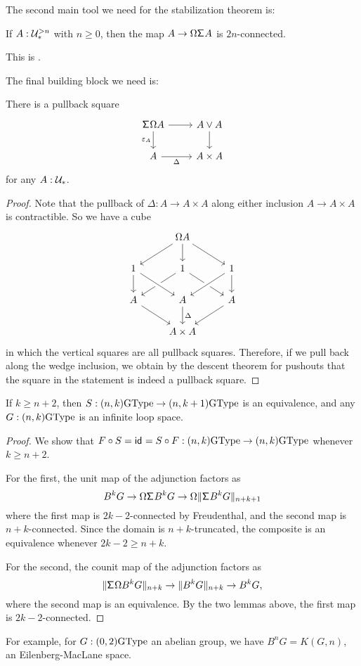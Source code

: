 The second main tool we need for the stabilization theorem is:
\begin{thm}[Freudenthal]
  If $A : \UU_\pt^{>n}$ with $n\ge 0$, then the map
  $A \to \Omega\susp A$ is $2n$-connected.
\end{thm}
This is \cite[Theorem~8.6.4]{TheBook}.

The final building block we need is:
\begin{lem}
  There is a pullback square
  \[
    \begin{tikzcd}
      \susp\Omega A \ar[d,"\varepsilon_A"']\ar[r] & A \vee A \ar[d] \\
      A \ar[r,"\Delta"'] & A \times A
    \end{tikzcd}
  \]
  for any $A : \UU_\pt$.
\end{lem}

\begin{proof}
Note that the pullback of $\Delta:A\to A\times A$ along either inclusion $A\to A\times A$ is contractible. So we have a cube
\begin{equation*}
\begin{tikzcd}
& \Omega A \arrow[dl] \arrow[d] \arrow[dr] \\
1 \arrow[d] & 1 \arrow[dl] \arrow[dr] & 1 \arrow[dl,crossing over] \arrow[d] \\
A \arrow[dr] & A \arrow[d,"\Delta"] \arrow[from=ul,crossing over] & A \arrow[dl] \\
& A\times A
\end{tikzcd}
\end{equation*}
in which the vertical squares are all pullback squares. Therefore, if we pull back along the wedge inclusion, we obtain by the descent theorem for pushouts that the square in the statement is indeed a pullback square.
\end{proof}

\begin{thm}[Stabilization]
  \label{thm:stabilization}
  If $k\ge n+2$, then $S : (n,k)\GType \to (n,k+1)\GType$ is an
  equivalence, and any $G : (n,k)\GType$ is an infinite loop space.
\end{thm}
\begin{proof}
  We show that $F\circ S=\idfunc=S\circ F : (n,k)\GType \to (n,k)\GType$
  whenever $k\ge n+2$.

  For the first, the unit map of the adjunction factors as
  \[
    B^kG \to \Omega\susp B^kG \to \Omega\trunc{n+k+1}{\susp B^kG}
  \]
  where the first map is $2k-2$-connected by Freudenthal, and the
  second map is $n+k$-connected. Since the domain is $n+k$-truncated,
  the composite is an equivalence whenever $2k-2 \ge n+k$.

  For the second, the counit map of the adjunction factors as
  \[
    \trunc{n+k}{\susp\Omega B^kG} \to \trunc{n+k}{B^kG} \to B^kG,
  \]
  where the second map is an equivalence. By the two lemmas above, the
  first map is $2k-2$-connected.
\end{proof}
For example, for $G : (0,2)\GType$ an abelian group, we have
$B^nG = K(G,n)$, an Eilenberg-MacLane space.

